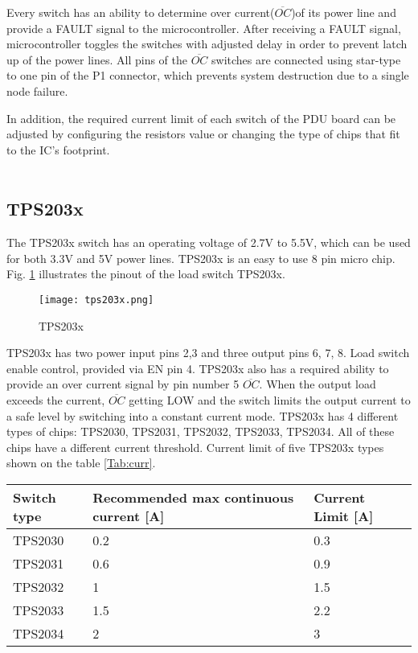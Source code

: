 Every switch has an ability to determine over current($\overline{OC}$)of its power line and provide a FAULT signal to the microcontroller. After receiving a FAULT signal,  microcontroller toggles the switches with adjusted delay in order to prevent latch up of the power lines. All pins of the $\overline {OC}$ switches are connected using star-type to one pin of the P1 connector, which prevents system destruction due to a single node failure.

In addition, the required current limit of each switch of the PDU board can be adjusted by configuring the resistors value or changing the type of chips that fit to the IC's footprint.   
  \\ \\
\subsection{TPS203x }
The TPS203x switch has an operating voltage of 2.7V to 5.5V, which can be used for both 3.3V and 5V power lines. TPS203x is an easy to use 8 pin micro chip. Fig. \ref{fig: PDU332} illustrates the pinout of the load switch TPS203x.

\begin{figure}[h]
	\centering
	\texttt{[image: tps203x.png]}
	\caption{TPS203x \cite{26}}
	\label{fig: PDU332}
\end{figure} 

TPS203x has two power input pins 2,3 and three output pins 6, 7, 8. Load switch enable control, provided via EN pin 4. TPS203x also has a required ability to provide an over current signal by pin number 5 $\overline{OC}$. \cite{26} When the output load exceeds the current, $\overline{OC}$ getting LOW and the switch limits the output current to a safe level by switching into a constant current mode. TPS203x has 4 different types of chips: TPS2030, TPS2031, TPS2032, TPS2033, TPS2034. All of these chips have a different current threshold. Current limit of five TPS203x types shown on the table \ref{Tab:curr}.\\

\begin{tabular}{p{4cm}p{5cm}p{4cm}} \toprule
	Switch type & Recommended max continuous  current [A] & Current Limit [A]\\ \midrule
	TPS2030 & 0.2 & 0.3\\
	TPS2031 & 0.6 & 0.9\\
	TPS2032 & 1 & 1.5\\
	TPS2033 & 1.5 & 2.2 \\
	TPS2034 & 2 & 3 \\
	
	\bottomrule
	
\end{tabular}\\ \\ \\ \\
\label{Tab:curr}

